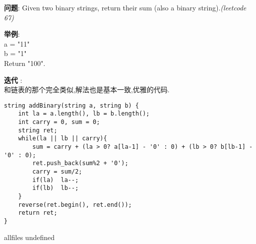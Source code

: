 \documentclass{article}
\begin{document}
\begin{CJK}{UTF8}{gbsn}     %

\else
    
\begin{description}
    \item{\textbf{问题}}: Given two binary strings, return their sum (also a binary string).\textit{(leetcode 67)}
	\item{\textbf{举例}}:\\
	a = "11"\\
	b = "1"\\
	Return "100".
    \item{\textbf{迭代}} : 
    \\和链表的那个完全类似,解法也是基本一致,优雅的代码.
    \begin{lstlisting}
string addBinary(string a, string b) {
	int la = a.length(), lb = b.length();
	int carry = 0, sum = 0;
	string ret;
	while(la || lb || carry){
		sum = carry + (la > 0? a[la-1] - '0' : 0) + (lb > 0? b[lb-1] - '0' : 0);
		ret.push_back(sum%2 + '0');
		carry = sum/2;
		if(la)	la--;
		if(lb)	lb--;
	}
	reverse(ret.begin(), ret.end());
	return ret;
}
    \end{lstlisting}
\end{description}

\fi

\ifx allfiles undefined
\end{CJK}
\end{document}
